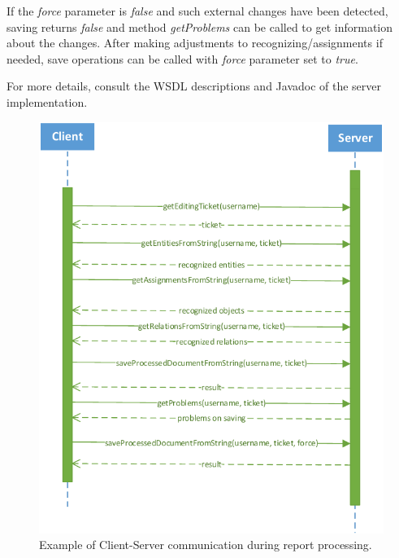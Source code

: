 If the \emph{force} parameter is \emph{false} and such external changes have
been detected, saving returns \emph{false} and method \emph{getProblems} can be
called to get information about the changes. After making adjustments to
recognizing/assignments if needed, save operations can be called with
\emph{force} parameter set to \emph{true}.

For more details, consult the WSDL descriptions and Javadoc of the server
implementation.

\begin{figure}[!htb]
        \centering
        \includegraphics[width=\textwidth]{Images/ClientServerCommunication}
        \caption{Example of Client-Server communication during report processing.}
        \label{fig:ClientServerCommunication}
\end{figure}
